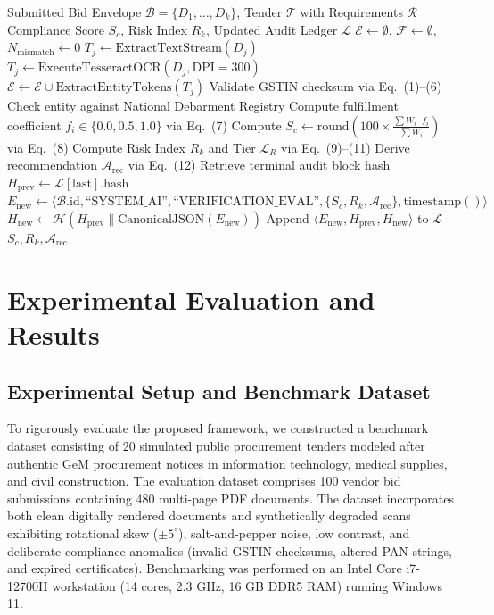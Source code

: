 \documentclass[conference]{IEEEtran}
\begin{document}
\begin{algorithm}[!ht]
\caption{End-to-End Automated Bid Verification and Cryptographic Audit Chaining}
\label{alg:verify}
\begin{algorithmic}[1]
\REQUIRE Submitted Bid Envelope $\mathcal{B} = \{D_1, \dots, D_k\}$, Tender $\mathcal{T}$ with Requirements $\mathcal{R}$
\ENSURE Compliance Score $S_c$, Risk Index $R_k$, Updated Audit Ledger $\mathcal{L}$
\STATE $\mathcal{E} \leftarrow \emptyset$, $\mathcal{F} \leftarrow \emptyset$, $N_{\text{mismatch}} \leftarrow 0$
    \STATE $T_j \leftarrow \text{ExtractTextStream}(D_j)$
        \STATE $T_j \leftarrow \text{ExecuteTesseractOCR}(D_j, \text{DPI}=300)$
    \ENDIF
    \STATE $\mathcal{E} \leftarrow \mathcal{E} \cup \text{ExtractEntityTokens}(T_j)$
\ENDFOR
\STATE Validate GSTIN checksum via Eq.~(1)--(6)
\STATE Check entity against National Debarment Registry
    \STATE Compute fulfillment coefficient $f_i \in \{0.0, 0.5, 1.0\}$ via Eq.~(7)
\ENDFOR
\STATE Compute $S_c \leftarrow \text{round}\left(100 \times \frac{\sum W_i \cdot f_i}{\sum W_i}\right)$ via Eq.~(8)
\STATE Compute Risk Index $R_k$ and Tier $\mathcal{L}_R$ via Eq.~(9)--(11)
\STATE Derive recommendation $\mathcal{A}_{\text{rec}}$ via Eq.~(12)
\STATE Retrieve terminal audit block hash $H_{\text{prev}} \leftarrow \mathcal{L}[\text{last}].\text{hash}$
\STATE $E_{\text{new}} \leftarrow \langle \mathcal{B}.\text{id}, \text{``SYSTEM\_AI''}, \text{``VERIFICATION\_EVAL''}, \{S_c, R_k, \mathcal{A}_{\text{rec}}\}, \text{timestamp}() \rangle$
\STATE $H_{\text{new}} \leftarrow \mathcal{H}(H_{\text{prev}} \parallel \text{CanonicalJSON}(E_{\text{new}}))$
\STATE Append $\langle E_{\text{new}}, H_{\text{prev}}, H_{\text{new}} \rangle$ to $\mathcal{L}$
\RETURN $S_c, R_k, \mathcal{A}_{\text{rec}}$
\end{algorithmic}
\end{algorithm}

\section{Experimental Evaluation and Results}

\subsection{Experimental Setup and Benchmark Dataset}
To rigorously evaluate the proposed framework, we constructed a benchmark dataset consisting of 20 simulated public procurement tenders modeled after authentic GeM procurement notices in information technology, medical supplies, and civil construction. The evaluation dataset comprises 100 vendor bid submissions containing 480 multi-page PDF documents. The dataset incorporates both clean digitally rendered documents and synthetically degraded scans exhibiting rotational skew ($\pm 5^\circ$), salt-and-pepper noise, low contrast, and deliberate compliance anomalies (invalid GSTIN checksums, altered PAN strings, and expired certificates). Benchmarking was performed on an Intel Core i7-12700H workstation (14 cores, 2.3 GHz, 16 GB DDR5 RAM) running Windows 11.
\end{document}

